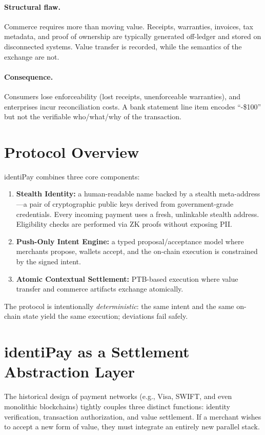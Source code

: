 \documentclass[11pt]{article}
\begin{document}
\paragraph{Structural flaw.}
Commerce requires more than moving value. Receipts, warranties, invoices, tax metadata, and proof of ownership are typically generated off-ledger and stored on disconnected systems. Value transfer is recorded, while the semantics of the exchange are not.

\paragraph{Consequence.}
Consumers lose enforceability (lost receipts, unenforceable warranties), and enterprises incur reconciliation costs. A bank statement line item encodes ``-\$100'' but not the verifiable who/what/why of the transaction.

\section{Protocol Overview}
identiPay combines three core components:
\begin{enumerate}
  \item \textbf{Stealth Identity:} a human-readable name backed by a stealth meta-address---a pair of cryptographic public keys derived from government-grade credentials. Every incoming payment uses a fresh, unlinkable stealth address. Eligibility checks are performed via ZK proofs without exposing PII.
  \item \textbf{Push-Only Intent Engine:} a typed proposal/acceptance model where merchants propose, wallets accept, and the on-chain execution is constrained by the signed intent.
  \item \textbf{Atomic Contextual Settlement:} PTB-based execution where value transfer and commerce artifacts exchange atomically.
\end{enumerate}

The protocol is intentionally \emph{deterministic}: the same intent and the same on-chain state yield the same execution; deviations fail safely.

\section{identiPay as a Settlement Abstraction Layer}

The historical design of payment networks (e.g., Visa, SWIFT, and even monolithic blockchains) tightly couples three distinct functions: identity verification, transaction authorization, and value settlement. If a merchant wishes to accept a new form of value, they must integrate an entirely new parallel stack.
\end{document}
